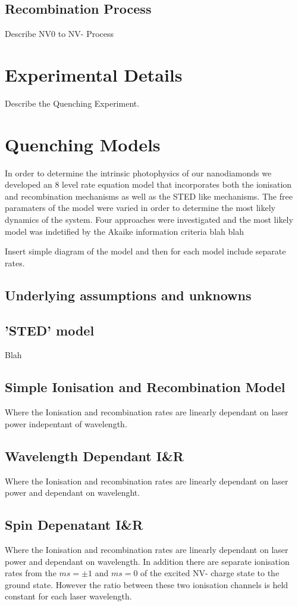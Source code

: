 \documentclass[preprint,prl,twocolumn]{revtex4}
\begin{document}
\subsection{Recombination Process}
Describe NV0 to NV- Process

\section{Experimental Details}
Describe the Quenching Experiment.

\section{Quenching Models}
In order to determine the intrinsic photophysics of our nanodiamonds we developed an 8 level rate equation model that incorporates both the ionisation and recombination mechanisms as well as the STED like mechanisms. The free paramaters of the model were varied in order to determine the most likely dynamics of the system. Four approaches were investigated and the most likely model was indetified by the Akaike information criteria blah blah

Insert simple diagram of the model and then for each model include separate rates.

\subsection{Underlying assumptions and unknowns}

\subsection{'STED' model}
Blah
\subsection{Simple Ionisation and Recombination Model}
Where the Ionisation and recombination rates are linearly dependant on laser power indepentant of wavelength.
\subsection{Wavelength Dependant I\&R}
Where the Ionisation and recombination rates are linearly dependant on laser power and dependant on wavelenght.
\subsection{Spin Depenatant I\&R}
Where the Ionisation and recombination rates are linearly dependant on laser power and dependant on wavelength. In addition there are separate ionisation rates from the $ms=\pm1$ and $ms=0$ of the excited NV- charge state to the ground state. However the ratio between these two ionisation channels is held constant for each laser wavelength.
\end{document}
